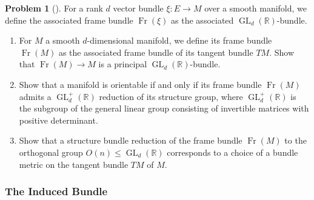 \documentclass[reqno]{amsart}
\theoremstyle{definition}
\newtheorem{problem}[theorem]{Problem}
\theoremstyle{remark}
\DeclareMathOperator{\GL}{GL}
\DeclareMathOperator{\Fr}{Fr}
\begin{document}
    \begin{problem}[]
    For a rank $d$ vector bundle
    $\xi \colon E \to M$ over a smooth manifold, we 
    define the associated frame bundle $\Fr \left( \xi \right) $ 
    as the associated $\GL_d \left( \mathbb{R} \right) $-bundle.
        \begin{enumerate}
            \item For $M$ a smooth $d$-dimensional
                manifold, we define its frame
                bundle $\Fr (M)$ as the associated
                frame bundle of its tangent bundle
                $TM$. Show that
                $\Fr(M) \to M$ is a principal 
                $\GL_d \left( \mathbb{R} \right) $-bundle.
            \item Show that a manifold is
                orientable if and only if its
                frame bundle $\Fr (M)$ admits a
                $\GL_d^{+} (\mathbb{R})$ reduction of
                its structure group, where
                $\GL_d^{+}(\mathbb{R})$ is the subgroup
                of the general linear group consisting
                of invertible matrices with positive determinant.
            \item Show that a structure bundle reduction of
                the frame bundle
                $\Fr(M)$ to the orthogonal group
                $O(n) \le \GL_d(\mathbb{R})$ corresponds
                to a choice of a bundle metric on the tangent
                bundle  $TM$ of $M$.
        \end{enumerate}
    \end{problem}


    \subsubsection{The Induced Bundle}
\end{document}
